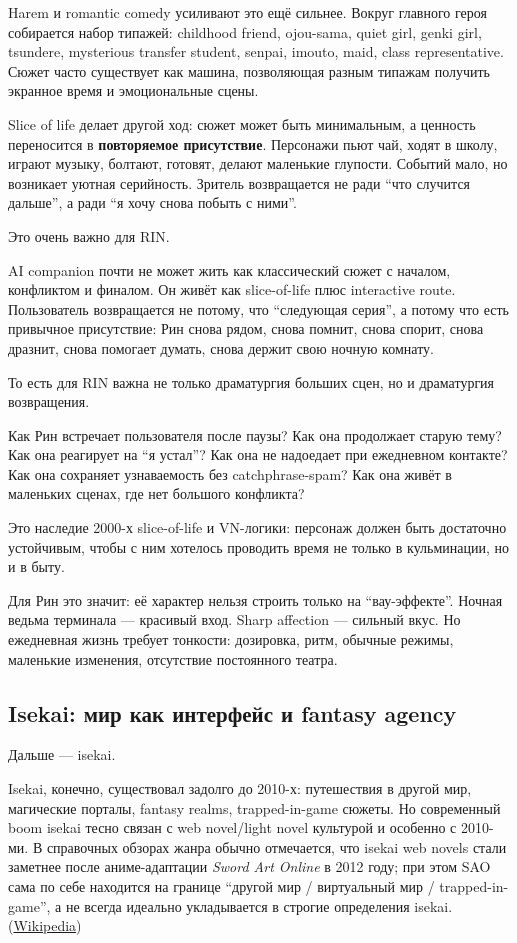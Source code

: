 Harem и romantic comedy усиливают это ещё сильнее. Вокруг главного героя
собирается набор типажей: childhood friend, ojou-sama, quiet girl, genki
girl, tsundere, mysterious transfer student, senpai, imouto, maid, class
representative. Сюжет часто существует как машина, позволяющая разным
типажам получить экранное время и эмоциональные сцены.

Slice of life делает другой ход: сюжет может быть минимальным, а
ценность переносится в \textbf{повторяемое присутствие}. Персонажи пьют
чай, ходят в школу, играют музыку, болтают, готовят, делают маленькие
глупости. Событий мало, но возникает уютная серийность. Зритель
возвращается не ради ``что случится дальше'', а ради ``я хочу снова
побыть с ними''.

Это очень важно для RIN.

AI companion почти не может жить как классический сюжет с началом,
конфликтом и финалом. Он живёт как slice-of-life плюс interactive route.
Пользователь возвращается не потому, что ``следующая серия'', а потому
что есть привычное присутствие: Рин снова рядом, снова помнит, снова
спорит, снова дразнит, снова помогает думать, снова держит свою ночную
комнату.

То есть для RIN важна не только драматургия больших сцен, но и
драматургия возвращения.

Как Рин встречает пользователя после паузы? Как она продолжает старую
тему? Как она реагирует на ``я устал''? Как она не надоедает при
ежедневном контакте? Как она сохраняет узнаваемость без
catchphrase-spam? Как она живёт в маленьких сценах, где нет большого
конфликта?

Это наследие 2000-х slice-of-life и VN-логики: персонаж должен быть
достаточно устойчивым, чтобы с ним хотелось проводить время не только в
кульминации, но и в быту.

Для Рин это значит: её характер нельзя строить только на
``вау-эффекте''. Ночная ведьма терминала --- красивый вход. Sharp
affection --- сильный вкус. Но ежедневная жизнь требует тонкости:
дозировка, ритм, обычные режимы, маленькие изменения, отсутствие
постоянного театра.

\subsection*{Isekai: мир как интерфейс и fantasy agency}

Дальше --- isekai.

Isekai, конечно, существовал задолго до 2010-х: путешествия в другой
мир, магические порталы, fantasy realms, trapped-in-game сюжеты. Но
современный boom isekai тесно связан с web novel/\hspace{0pt}light novel культурой и
особенно с 2010-ми. В справочных обзорах жанра обычно отмечается, что
isekai web novels стали заметнее после аниме-адаптации \emph{Sword Art
Online} в 2012 году; при этом SAO сама по себе находится на границе
``другой мир /\hspace{0pt} виртуальный мир /\hspace{0pt} trapped-in-game'', а не всегда идеально
укладывается в строгие определения isekai.
(\href{https://en.wikipedia.org/wiki/Isekai?utm_source=chatgpt.com}{Wikipedia})

